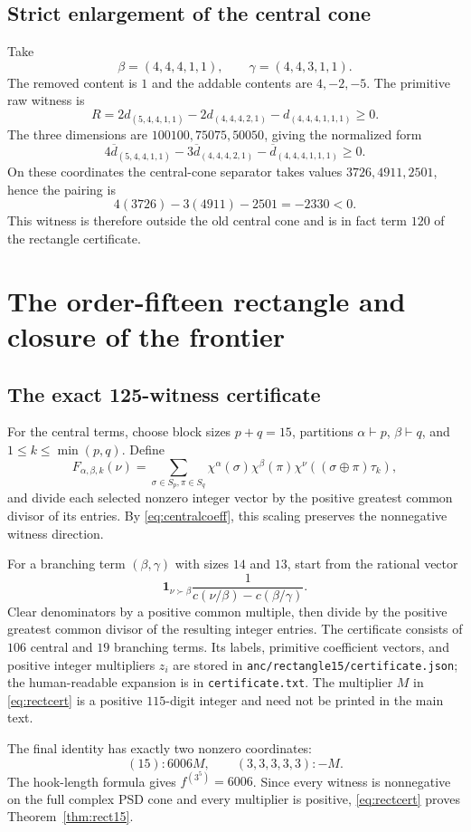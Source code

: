 \documentclass[11pt]{article}
\theoremstyle{definition}
\newcommand{\dbar}{\overline d}
\newcommand{\youngcovers}{\succ}
\begin{document}
\subsection{Strict enlargement of the central cone}
Take
\[
 \beta=(4,4,4,1,1),\qquad \gamma=(4,4,3,1,1).
\]
The removed content is $1$ and the addable contents are $4,-2,-5$.  The primitive raw witness is
\[
 R=2d_{(5,4,4,1,1)}-2d_{(4,4,4,2,1)}-d_{(4,4,4,1,1,1)}\ge0.
\]
The three dimensions are $100100,75075,50050$, giving the normalized form
\[
 4\dbar_{(5,4,4,1,1)}-3\dbar_{(4,4,4,2,1)}-\dbar_{(4,4,4,1,1,1)}\ge0.
\]
On these coordinates the central-cone separator takes values $3726,4911,2501$, hence the pairing is
\[
 4(3726)-3(4911)-2501=-2330<0.
\]
This witness is therefore outside the old central cone and is in fact term $120$ of the rectangle certificate.

\section{The order-fifteen rectangle and closure of the frontier}\label{sec:rect}
\subsection{The exact 125-witness certificate}
For the central terms, choose block sizes $p+q=15$, partitions $\alpha\vdash p$, $\beta\vdash q$, and $1\le k\le\min(p,q)$.  Define
\[
 F_{\alpha,\beta,k}(\nu)=
 \sum_{\sigma\in S_p,\pi\in S_q}
 \chi^\alpha(\sigma)\chi^\beta(\pi)
 \chi^\nu((\sigma\oplus\pi)\tau_k),
\]
and divide each selected nonzero integer vector by the positive greatest common divisor of its entries.  By \eqref{eq:centralcoeff}, this scaling preserves the nonnegative witness direction.

For a branching term $(\beta,\gamma)$ with sizes $14$ and $13$, start from the rational vector
\[
 \mathbf 1_{\nu\youngcovers\beta}
 \frac1{c(\nu/\beta)-c(\beta/\gamma)}.
\]
Clear denominators by a positive common multiple, then divide by the positive greatest common divisor of the resulting integer entries.
The certificate consists of $106$ central and $19$ branching terms.  Its labels, primitive coefficient vectors, and positive integer multipliers $z_i$ are stored in \texttt{anc/rectangle15/certificate.json}; the human-readable expansion is in \texttt{certificate.txt}.  The multiplier $M$ in \eqref{eq:rectcert} is a positive $115$-digit integer and need not be printed in the main text.

The final identity has exactly two nonzero coordinates:
\[
 (15): 6006M,
 \qquad (3,3,3,3,3):-M.
\]
The hook-length formula gives $f^{(3^5)}=6006$.  Since every witness is nonnegative on the full complex PSD cone and every multiplier is positive, \eqref{eq:rectcert} proves Theorem~\ref{thm:rect15}.
\end{document}
